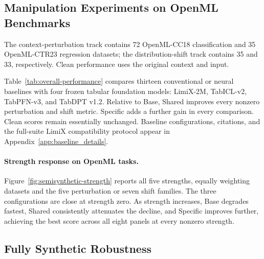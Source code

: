 \subsection{Manipulation Experiments on OpenML Benchmarks}
\label{sec:semi_synthetic_results}

The context-perturbation track contains 72 OpenML-CC18 classification and 35
OpenML-CTR23 regression datasets; the distribution-shift track contains 35
and 33, respectively. Clean performance uses the original context and input.

\nocite{cox1958binary,hoerl1970ridge,cortes1995svm,drucker1996svr,
cover1967knn,breiman2001randomforests,ke2017lightgbm,
prokhorenkova2018catboost,chen2016xgboost,rumelhart1986backprop,
gorishniy2021fttransformer,gorishniy2025tabm,thielmann2024tabularnn,
ahamed2024mambatab,holzmueller2024realmlp,qu2026tabiclv2,
grinsztajn2026tabpfn3technicalreport,wang2026limix2m,ma2025tabdpt}

Table~\ref{tab:overall-performance} compares thirteen conventional or neural
baselines with four frozen tabular foundation models: LimiX-2M, TabICL-v2,
TabPFN-v3, and TabDPT v1.2. Relative to Base, Shared improves every nonzero
perturbation and shift metric. Specific adds a further gain in every comparison.
Clean scores remain essentially unchanged. Baseline configurations,
citations, and the full-suite LimiX compatibility protocol appear in
Appendix~\ref{app:baseline_details}.

\paragraph{Strength response on OpenML tasks.}
Figure~\ref{fig:semisynthetic-strength} reports all five strengths, equally
weighting datasets and the five perturbation or seven shift families. The
three configurations are close at strength zero. As strength increases, Base
degrades fastest, Shared consistently attenuates the decline, and Specific
improves further, achieving the best score across all eight panels at every
nonzero strength.

\subsection{Fully Synthetic Robustness}
\label{sec:results}

